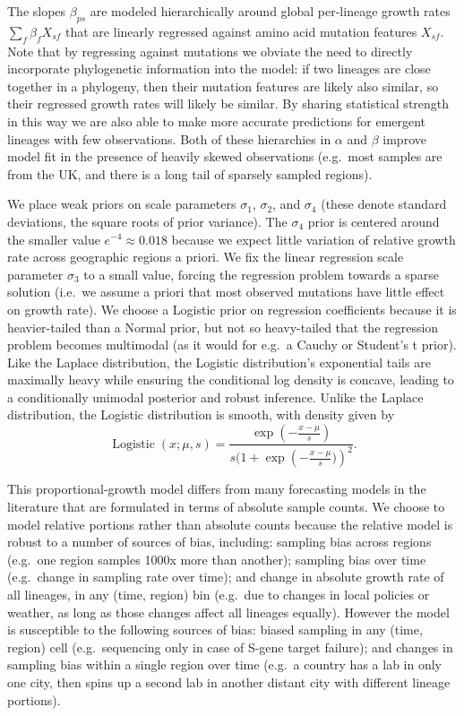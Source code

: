 \documentclass[12pt]{article}
\begin{document}
The slopes $\beta_{ps}$ are modeled hierarchically around global per-lineage growth rates $\sum_f \beta_f X_{sf}$ that are linearly regressed against amino acid mutation features $X_{sf}$.
Note that by regressing against mutations we obviate the need to directly incorporate phylogenetic information into the model: if two lineages are close together in a phylogeny, then their mutation features are likely also similar, so their regressed growth rates will likely be similar.
By sharing statistical strength in this way we are also able to make more accurate predictions for emergent lineages with few observations.
Both of these hierarchies in $\alpha$ and $\beta$ improve model fit in the presence of heavily skewed observations (e.g.~most samples are from the UK, and there is a long tail of sparsely sampled regions).

We place weak priors on scale parameters $\sigma_1$, $\sigma_2$, and $\sigma_4$ (these denote standard deviations, the square roots of prior variance).
The $\sigma_4$ prior is centered around the smaller value $e^{-4}\approx 0.018$ because we expect little variation of relative growth rate across geographic regions a priori.
We fix the linear regression scale parameter $\sigma_3$ to a small value, forcing the regression problem towards a sparse solution (i.e.~we assume a priori that most observed mutations have little effect on growth rate).
We choose a Logistic prior on regression coefficients because it is heavier-tailed than a Normal prior, but not so heavy-tailed that the regression problem becomes multimodal (as it would for e.g.~a Cauchy or Student's t prior).
Like the Laplace distribution, the Logistic distribution's exponential tails are maximally heavy while ensuring the conditional log density is concave, leading to a conditionally unimodal posterior and robust inference.
Unlike the Laplace distribution, the Logistic distribution is smooth, with density given by
$$
\operatorname{Logistic}(x;\mu,s) = \frac
    {\exp(-\frac{x-\mu}s)}
    {s(1 + \exp\left(-\frac{x-\mu}s)\right)^2}.
$$

This proportional-growth model differs from many forecasting models in the literature that are formulated in terms of absolute sample counts.
We choose to model relative portions rather than absolute counts because the relative model is robust to a number of sources of bias, including:
sampling bias across regions (e.g.~one region samples 1000x more than another);
sampling bias over time (e.g.~change in sampling rate over time); and
change in absolute growth rate of all lineages, in any (time, region) bin (e.g.~due to changes in local policies or weather, as long as those changes affect all lineages equally).
However the model is susceptible to the following sources of bias:
biased sampling in any (time, region) cell (e.g.~sequencing only in case of S-gene target failure); and changes in sampling bias within a single region over time (e.g.~a country has a lab in only one city, then spins up a second lab in another distant city with different lineage portions).
\end{document}
